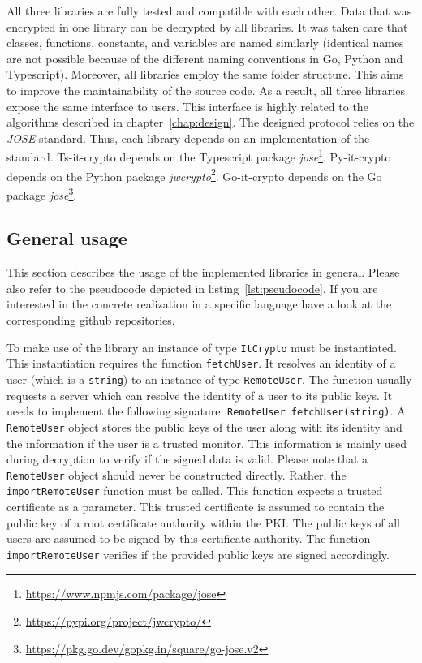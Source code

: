 \documentclass[../main.tex]{subfiles}
\begin{document}
All three libraries are fully tested and compatible with each other.
Data that was encrypted in one library can be decrypted by all libraries.
It was taken care that classes, functions, constants, and variables are named similarly (identical names are not possible because of the different naming conventions in Go, Python and Typescript).
Moreover, all libraries employ the same folder structure.
This aims to improve the maintainability of the source code.
As a result, all three libraries expose the same interface to users.
This interface is highly related to the algorithms described in chapter~\ref{chap:design}.
The designed protocol relies on the \emph{JOSE} standard.
Thus, each library depends on an implementation of the standard.
Ts-it-crypto depends on the Typescript package \emph{jose}\footnote{\url{https://www.npmjs.com/package/jose}}.
Py-it-crypto depends on the Python package \emph{jwcrypto}\footnote{\url{https://pypi.org/project/jwcrypto/}}.
Go-it-crypto depends on the Go package \emph{jose}\footnote{\url{https://pkg.go.dev/gopkg.in/square/go-jose.v2}}.

\subsection{General usage}

This section describes the usage of the implemented libraries in general.
Please also refer to the pseudocode depicted in listing~\ref{lst:pseudocode}.
If you are interested in the concrete realization in a specific language have a look at the corresponding github repositories.

To make use of the library an instance of type \verb|ItCrypto| must be instantiated.
This instantiation requires the function \verb|fetchUser|.
It resolves an identity of a user (which is a \verb|string|) to an instance of type \verb|RemoteUser|.
The function usually requests a server which can resolve the identity of a user to its public keys.
It needs to implement the following signature: \verb|RemoteUser fetchUser(string)|.
A \verb|RemoteUser| object stores the public keys of the user along with its identity and the information if the user is a trusted monitor.
This information is mainly used during decryption to verify if the signed data is valid.
Please note that a \verb|RemoteUser| object should never be constructed directly.
Rather, the \verb|importRemoteUser| function must be called.
This function expects a trusted certificate as a parameter.
This trusted certificate is assumed to contain the public key of a root certificate authority within the PKI.
The public keys of all users are assumed to be signed by this certificate authority.
The function \verb|importRemoteUser| verifies if the provided public keys are signed accordingly.
\end{document}

